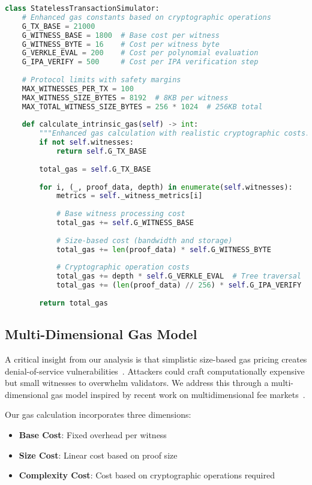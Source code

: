 \documentclass{article}
\begin{document}
\begin{lstlisting}[language=Python,caption={Enhanced Transaction Simulator},label={lst:tx-simulator}]
class StatelessTransactionSimulator:
    # Enhanced gas constants based on cryptographic operations
    G_TX_BASE = 21000
    G_WITNESS_BASE = 1800  # Base cost per witness
    G_WITNESS_BYTE = 16    # Cost per witness byte
    G_VERKLE_EVAL = 200    # Cost per polynomial evaluation
    G_IPA_VERIFY = 500     # Cost per IPA verification step
    
    # Protocol limits with safety margins
    MAX_WITNESSES_PER_TX = 100
    MAX_WITNESS_SIZE_BYTES = 8192  # 8KB per witness
    MAX_TOTAL_WITNESS_SIZE_BYTES = 256 * 1024  # 256KB total
    
    def calculate_intrinsic_gas(self) -> int:
        """Enhanced gas calculation with realistic cryptographic costs."""
        if not self.witnesses:
            return self.G_TX_BASE
        
        total_gas = self.G_TX_BASE
        
        for i, (_, proof_data, depth) in enumerate(self.witnesses):
            metrics = self._witness_metrics[i]
            
            # Base witness processing cost
            total_gas += self.G_WITNESS_BASE
            
            # Size-based cost (bandwidth and storage)
            total_gas += len(proof_data) * self.G_WITNESS_BYTE
            
            # Cryptographic operation costs
            total_gas += depth * self.G_VERKLE_EVAL  # Tree traversal
            total_gas += (len(proof_data) // 256) * self.G_IPA_VERIFY
        
        return total_gas
\end{lstlisting}

\subsection{Multi-Dimensional Gas Model}

A critical insight from our analysis is that simplistic size-based gas pricing creates denial-of-service vulnerabilities~\cite{chen2017gas}. Attackers could craft computationally expensive but small witnesses to overwhelm validators. We address this through a multi-dimensional gas model inspired by recent work on multidimensional fee markets~\cite{buterin2022multi}.

Our gas calculation incorporates three dimensions:
\begin{itemize}
\item \textbf{Base Cost}: Fixed overhead per witness
\item \textbf{Size Cost}: Linear cost based on proof size
\item \textbf{Complexity Cost}: Cost based on cryptographic operations required
\end{itemize}
\end{document}
